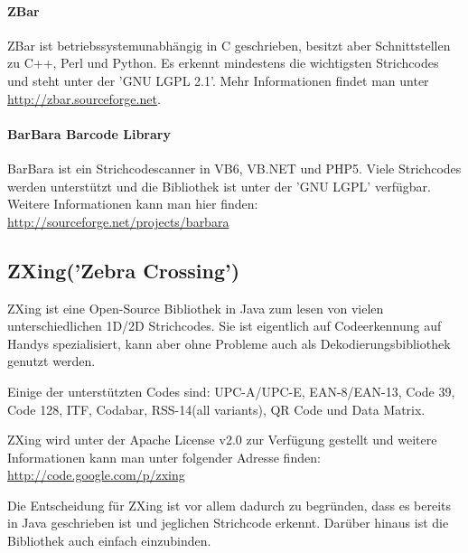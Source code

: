 \paragraph*{ZBar}
ZBar ist betriebssystemunabhängig in C geschrieben, besitzt aber Schnittstellen zu C++, Perl und Python. Es erkennt mindestens die wichtigsten Strichcodes und steht unter der 'GNU LGPL 2.1'. Mehr Informationen findet man unter \url{http://zbar.sourceforge.net}.

\paragraph*{BarBara Barcode Library}
BarBara ist ein Strichcodescanner in VB6, VB.NET und PHP5. Viele Strichcodes werden unterstützt und die Bibliothek ist unter der 'GNU LGPL' verfügbar. Weitere Informationen kann man hier finden: \url{http://sourceforge.net/projects/barbara}


\subsection*{ZXing('Zebra Crossing')}
ZXing ist eine Open-Source Bibliothek in Java zum lesen von vielen unterschiedlichen 1D/2D Strichcodes. Sie ist eigentlich auf Codeerkennung auf Handys spezialisiert, kann aber ohne Probleme auch als Dekodierungsbibliothek genutzt werden.

Einige der unterstützten Codes sind: UPC-A/UPC-E, EAN-8/EAN-13, Code 39, Code 128, ITF, Codabar, RSS-14(all variants), QR Code und Data Matrix.

ZXing wird unter der Apache License v2.0 zur Verfügung gestellt und weitere Informationen kann man unter folgender Adresse finden: \url{http://code.google.com/p/zxing}

Die Entscheidung für ZXing ist vor allem dadurch zu begründen, dass es bereits in Java geschrieben ist und jeglichen Strichcode erkennt. Darüber hinaus ist die Bibliothek auch einfach einzubinden.
